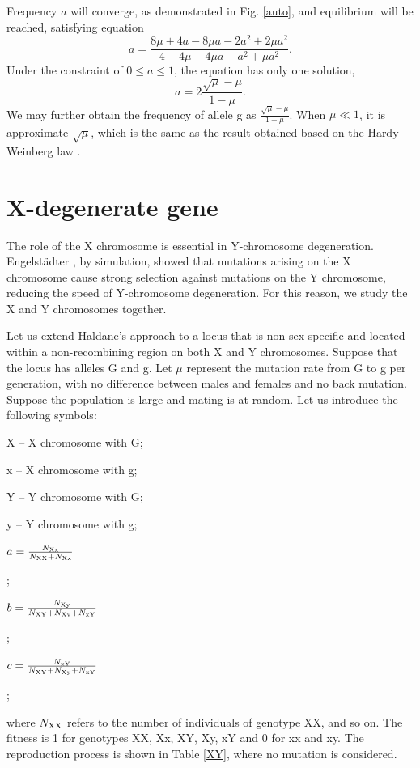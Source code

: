 \documentclass[referee,sn-basic]{sn-jnl}%
\theoremstyle{thmstyleone}%
\theoremstyle{thmstyletwo}%
\theoremstyle{thmstylethree}%
\begin{document}
Frequency $a$ will converge, as demonstrated in Fig. \ref{auto}, and equilibrium will be reached, satisfying equation
\begin{equation}
        a=\frac{8 \mu + 4a - 8 \mu a -  2a^2 + 2\mu a^2}{4 + 4 \mu - 4\mu a - a^2 + \mu a^2 }.
\end{equation}
Under the constraint of $0\le a\le 1$, the equation has only one solution,
\begin{equation}\label{2sqrtmu}
        a =2\frac{\sqrt{\mu}-\mu}{1-\mu}.
\end{equation}
We may further obtain the frequency of allele g as $\frac{\sqrt{\mu}-\mu}{1-\mu}$. When  $\mu\ll 1$, it is approximate $\sqrt{\mu}$, which is the same as the result obtained based on the Hardy-Weinberg law \citep{johnston2019population}. 

\section{X-degenerate gene}
The role of the X chromosome is essential in Y-chromosome degeneration. Engelst\"{a}dter \citep{engelstadter2008muller}, by simulation, showed that mutations arising on the X chromosome cause strong selection against mutations on the Y chromosome, reducing the speed of Y-chromosome degeneration. 
For this reason, we study the X and Y chromosomes together.

Let us extend Haldane's approach to a locus that is non-sex-specific and located within a non-recombining region on both X and Y chromosomes. Suppose that the locus has alleles G and g. Let $\mu$ represent the mutation rate from G to g per generation, with no difference between males and females and no back mutation. Suppose the population is large and mating is at random. 
Let us introduce the following symbols:
\begin{itemize}
\itemsep=0pt \parskip=0pt
\item X --	  X chromosome with G;
\item x -- 	  X chromosome with g;
\item Y --	  Y chromosome with G;
\item y -- 	  Y chromosome with g;
\vspace{1mm}
{
\item $ a=\frac{N_{\rm Xx}}{N_{\rm XX}+N_{\rm Xx}}$ }; 
\vspace{1mm}
{
\item $ b=\frac{N_{\rm Xy}}{N_{\rm XY}+N_{\rm Xy}+N_{\rm xY}}$}; 
\vspace{1mm}
{
\item $ c=\frac{N_{\rm xY}}{N_{\rm XY}+N_{\rm Xy}+N_{\rm xY}}$}; 
\end{itemize}
where $N_{\rm XX}$ refers to the number of individuals of genotype XX, and so on. 
The fitness is 1 for genotypes XX, Xx, XY, Xy, xY and 0 for xx and xy.
The reproduction process is shown in Table \ref{XY}, where no mutation is considered. 
\end{document}
